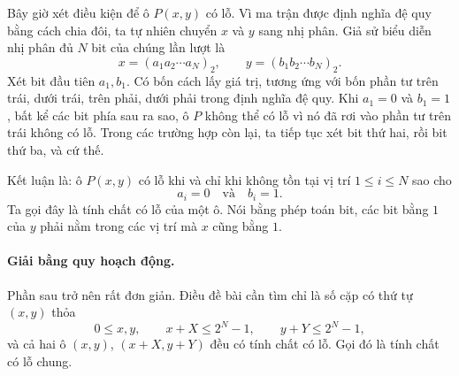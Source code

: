 \documentclass[11pt]{article}
\begin{document}
\begin{center}
\end{center}

Bây giờ xét điều kiện để ô $P(x,y)$ có lỗ. Vì ma trận được định nghĩa đệ quy
bằng cách chia đôi, ta tự nhiên chuyển $x$ và $y$ sang nhị phân. Giả sử biểu
diễn nhị phân đủ $N$ bit của chúng lần lượt là
\[
  x=(a_1a_2\cdots a_N)_2,\qquad
  y=(b_1b_2\cdots b_N)_2.
\]
Xét bit đầu tiên $a_1,b_1$. Có bốn cách lấy giá trị, tương ứng với bốn phần
tư trên trái, dưới trái, trên phải, dưới phải trong định nghĩa đệ quy. Khi
$a_1=0$ và $b_1=1$, bất kể các bit phía sau ra sao, ô $P$ không thể có lỗ vì
nó đã rơi vào phần tư trên trái không có lỗ. Trong các trường hợp còn lại,
ta tiếp tục xét bit thứ hai, rồi bit thứ ba, và cứ thế.

\begin{center}
\end{center}

Kết luận là: ô $P(x,y)$ có lỗ khi và chỉ khi không tồn tại vị trí
$1\le i\le N$ sao cho
\[
  a_i=0\quad\text{và}\quad b_i=1.
\]
Ta gọi đây là tính chất có lỗ của một ô. Nói bằng phép toán bit, các bit bằng
$1$ của $y$ phải nằm trong các vị trí mà $x$ cũng bằng $1$.

\paragraph{Giải bằng quy hoạch động.}
Phần sau trở nên rất đơn giản. Điều đề bài cần tìm chỉ là số cặp có thứ tự
$(x,y)$ thỏa
\[
  0\le x,y,\qquad x+X\le 2^N-1,\qquad y+Y\le 2^N-1,
\]
và cả hai ô $(x,y)$, $(x+X,y+Y)$ đều có tính chất có lỗ. Gọi đó là tính chất
có lỗ chung.
\end{document}
